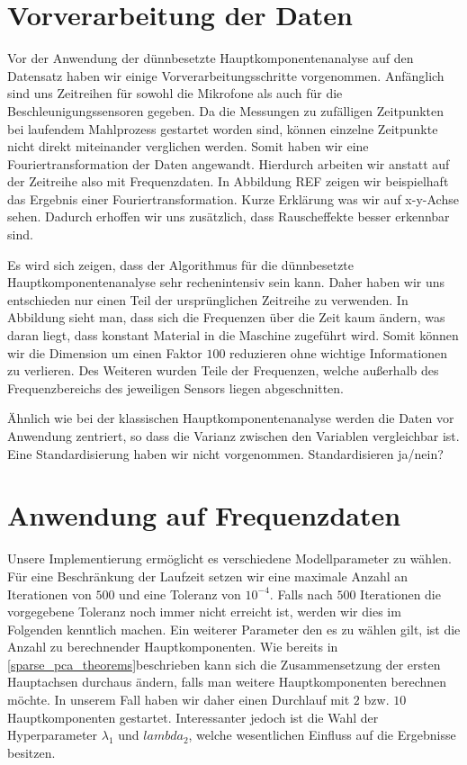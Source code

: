 \section{Vorverarbeitung der Daten}

Vor der Anwendung der dünnbesetzte Hauptkomponentenanalyse auf den Datensatz haben wir einige Vorverarbeitungsschritte vorgenommen. Anfänglich sind uns Zeitreihen für sowohl die Mikrofone als auch für die Beschleunigungssensoren gegeben. Da die Messungen zu zufälligen Zeitpunkten bei laufendem Mahlprozess gestartet worden sind, können einzelne Zeitpunkte nicht direkt miteinander verglichen werden. Somit haben wir eine Fouriertransformation der Daten angewandt. Hierdurch arbeiten wir anstatt auf der Zeitreihe also mit Frequenzdaten. In Abbildung REF zeigen wir beispielhaft das Ergebnis einer Fouriertransformation. Kurze Erklärung was wir auf x-y-Achse sehen. Dadurch erhoffen wir uns zusätzlich, dass Rauscheffekte besser erkennbar sind.

Es wird sich zeigen, dass der Algorithmus für die dünnbesetzte Hauptkomponentenanalyse sehr rechenintensiv sein kann. Daher haben wir uns entschieden nur einen Teil der ursprünglichen Zeitreihe zu verwenden. In Abbildung sieht man, dass sich die Frequenzen über die Zeit kaum ändern, was daran liegt, dass konstant Material in die Maschine zugeführt wird. Somit können wir die Dimension um einen Faktor $100$ reduzieren ohne wichtige Informationen zu verlieren. Des Weiteren  wurden Teile der Frequenzen, welche außerhalb des Frequenzbereichs des jeweiligen Sensors liegen abgeschnitten. 

Ähnlich wie bei der klassischen Hauptkomponentenanalyse werden die Daten vor Anwendung zentriert, so dass die Varianz zwischen den Variablen vergleichbar ist. Eine Standardisierung haben wir nicht vorgenommen. Standardisieren ja/nein? 





\section{Anwendung auf Frequenzdaten}
\label{application_frequency_data}

Unsere Implementierung ermöglicht es verschiedene Modellparameter zu wählen. Für eine Beschränkung der Laufzeit setzen wir eine maximale Anzahl an Iterationen von $500$ und eine Toleranz von $10^{-4}$. Falls nach $500$ Iterationen die vorgegebene Toleranz noch immer nicht erreicht ist, werden wir dies im Folgenden kenntlich machen. Ein weiterer Parameter den es zu wählen gilt, ist die Anzahl zu berechnender Hauptkomponenten. Wie bereits in \ref{sparse_pca_theorems}beschrieben kann sich die Zusammensetzung der ersten Hauptachsen durchaus ändern, falls man weitere Hauptkomponenten berechnen möchte. In unserem Fall haben wir daher einen Durchlauf mit $2$ bzw. $10$ Hauptkomponenten gestartet. Interessanter jedoch ist die Wahl der Hyperparameter $\lambda_1$ und $lambda_2$, welche wesentlichen Einfluss auf die Ergebnisse besitzen. 

